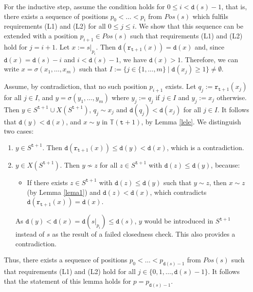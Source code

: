 \documentclass[preprint,12pt,english]{article}
\def\tr{\mathtt{r}}
\def\depth{\mathtt{d}}
\def\ty{\mathtt{t}}
\begin{document}
For the inductive step, assume the condition holds for $0\leq i<\depth(s)-1$, that is, there exists a sequence of positions 
$p_0<\ldots<p_i$ from $Pos(s)$ which fulfils requirements (L1) and (L2) for all $0\leq j\leq i$. We show that this sequence can be extended with a position $p_{i+1}\in Pos(s)$ such that  requirements (L1) and (L2) hold for $j=i+1$. Let $x:=s|_{p_i}.$ Then $\depth(\tr_{\ty+1}(x))=\depth(x)$ and, since $\depth(x)=\depth(s)-i$ and $i<\depth(s)-1$, we have $\depth(x)>1$. Therefore, we can write $x=\sigma(x_1,\ldots,x_m)$  such that $I:=\{j\in\{1,\ldots,m\}\mid \depth(x_j)\geq 1\}\neq\emptyset.$


Assume, by contradiction, that no such position $p_{i+1}$ exists. Let $q_j:=\tr_{\ty+1}(x_j)$ for all $j\in I$, and $y=\sigma(y_1,\ldots,y_m)$ where $y_j:=q_j$ if $j\in I$ and $y_j:=x_j$ otherwise. Then $y\in S^{\ty+1}\cup X(S^{\ty+1})$,
 $q_j\sim x_j$ and $\depth(q_j)<\depth(x_j)$ for all $j\in I$. It follows that $\depth(y)<\depth(x)$, and
$x\sim y$ in $\mathbb{T}(\ty+1)$, by Lemma \ref{lele}. We distinguish two cases:
\begin{enumerate}
\item $y\in S^{\ty+1}$. Then $\depth(\tr_{\ty+1}(x))\leq \depth(y)<\depth(x)$, which is a contradiction.
\item $y\in X(S^{\ty+1})$. Then $y\nsim z$ for all $z\in S^{\ty+1}$ with $\depth(z)\leq\depth(y)$, because:
\begin{itemize}
\item[] If there exists $z\in S^{\ty+1}$ with $\depth(z)\leq\depth(y)$ such that $y\sim z$, then $x\sim z$ (by Lemma \ref{lema1}) and $\depth(z)<\depth(x)$, which contradicts $\depth(\tr_{\ty+1}(x))=\depth(x)$.
\end{itemize}
As $\depth(y)<\depth(x)=\depth(s|_{p_i})\leq\depth(s)$, $y$ would be introduced in $S^{\ty+1}$ instead of $s$ as the result of a failed closedness check. This also provides a contradiction.
\end{enumerate}
Thus, there exists a sequence of positions $p_0<\ldots<p_{\depth(s)-1}$ from $Pos(s)$ such that requirements (L1) and (L2) hold for all $j\in\{0,1,\ldots, \depth(s)-1\}$. 
It follows that the statement of this lemma holds for $p=p_{\depth(s)-1}.$
\end{document}
